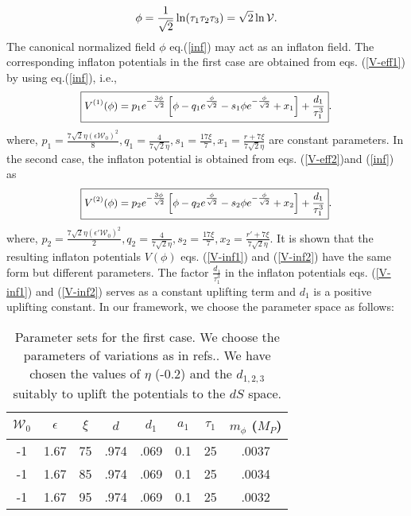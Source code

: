 \documentclass[doublecol]{epl2}
\begin{document}
\begin{equation}\small
        \phi=\frac{1}{\sqrt{2}}\ln(\tau_1\tau_2\tau_3)
        =\sqrt{2}\ln\mathcal{V}.
        \label{inf}
\end{equation} The canonical normalized field $\phi$ eq.(\ref{inf}) may act as an inflaton field. The corresponding inflaton potentials in the first case are obtained from eqs. (\ref{V-eff1}) by using eq.(\ref{inf}), i.e., 
\begin{equation}\small
\boxed{V^{(1)}(\phi)=p_1 e^{-\frac{3\phi}{\sqrt{2}}}\left[\phi-q_1 e^{\frac{\phi}{\sqrt{2}}}-s_1\phi e^{-\frac{\phi}{\sqrt{2}}}+x_1\right]+\frac{d_1}{\tau_1^3}}.
\label{V-inf1}
\end{equation} where, $p_1=\frac{7\sqrt{2}\eta\left(\epsilon\mathcal{W}_0
    \right)^2}{8},q_1=\frac{4}{7\sqrt{2}\eta}, s_1=\frac{17\xi}{7},x_1=\frac{r+7\xi}{7\sqrt{2}\eta}$ are constant parameters. In the second case, the inflaton potential is obtained from eqs. (\ref{V-eff2})and (\ref{inf}) as
\begin{equation}\small
\boxed{V^{(2)}(\phi)=p_2 e^{-\frac{3\phi}{\sqrt{2}}}\left[\phi-q_2 e^{\frac{\phi}{\sqrt{2}}}-s_2\phi e^{-\frac{\phi}{\sqrt{2}}}+x_2\right]+\frac{d_1}{\tau_1^3}}.
\label{V-inf2}
\end{equation}
where, $p_2=\frac{7\sqrt{2}\eta\left(\epsilon'\mathcal{W}_0\right)^2}{2},q_2=\frac{4}{7\sqrt{2}\eta},s_2=\frac{17\xi}{7},x_2=\frac{r'+7\xi}{7\sqrt{2}\eta}$. It is shown that the resulting inflaton potentials $V(\phi)$  eqs. (\ref{V-inf1}) and (\ref{V-inf2}) have the same form but different parameters.  The factor $\frac{d_1}{\tau_1^3}$ in the inflaton potentials eqs. (\ref{V-inf1}) and (\ref{V-inf2}) serves as a constant uplifting term and $d_1$ is a positive uplifting constant. In our framework, we choose the parameter space as follows:
\begin{table}[H]
    \centering
    \caption{Parameter sets for the first case. We choose the parameters of variations as in refs.\cite{Let:2022fmu,Basiouris:2020jgp,Basiouris:2021sdf}. We have chosen the values of $\eta$ (-0.2)  and the $d_{1,2,3}$ suitably to uplift the potentials to the $dS$ space.}
    \begin{tabular}{|c|c|c|c|c|c|c|c|}
    \hline
    $\mathcal{W}_0$ & $\epsilon$ & $\xi$ & $d$ & $d_1$ & $a_1$ & $\tau_1$ & $m_\phi$ ($M_P$) \\
    \hline
        -1 & 1.67 & 75 & .974 & .069 & 0.1 & 25 & .0037  \\
        -1 & 1.67 & 85 & .974 & .069 & 0.1 & 25 & .0034  \\
         -1 & 1.67 & 95 & .974 & .069 & 0.1 & 25 & .0032  \\
         \hline
    \end{tabular}
    \label{tab:first case}
\end{table}
\end{document}
